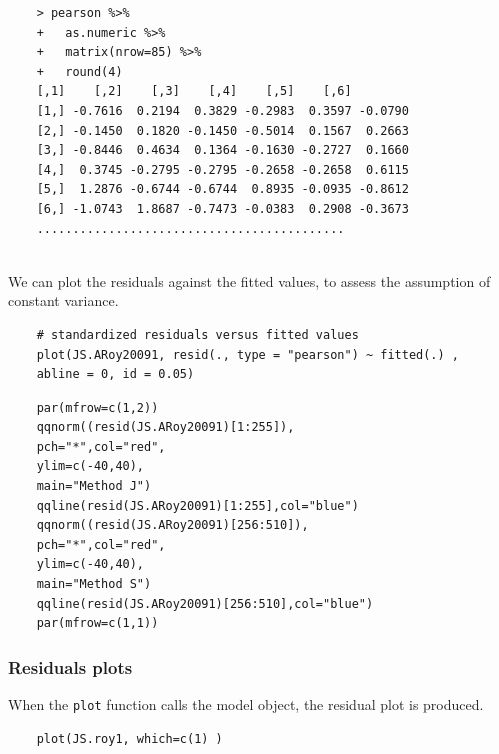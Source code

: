 \documentclass[Main.tex]{subfiles}
\begin{document}
\begin{framed}
	\begin{verbatim}
	> pearson %>%
	+   as.numeric %>% 
	+   matrix(nrow=85) %>%
	+   round(4) 
	[,1]    [,2]    [,3]    [,4]    [,5]    [,6]
	[1,] -0.7616  0.2194  0.3829 -0.2983  0.3597 -0.0790
	[2,] -0.1450  0.1820 -0.1450 -0.5014  0.1567  0.2663
	[3,] -0.8446  0.4634  0.1364 -0.1630 -0.2727  0.1660
	[4,]  0.3745 -0.2795 -0.2795 -0.2658 -0.2658  0.6115
	[5,]  1.2876 -0.6744 -0.6744  0.8935 -0.0935 -0.8612
	[6,] -1.0743  1.8687 -0.7473 -0.0383  0.2908 -0.3673
	...........................................
	
	\end{verbatim}
\end{framed}

We can plot the residuals against the fitted values, to assess the assumption of constant variance. 
\begin{framed}
	\begin{verbatim}
	# standardized residuals versus fitted values 
	plot(JS.ARoy20091, resid(., type = "pearson") ~ fitted(.) , 
	abline = 0, id = 0.05)
	\end{verbatim}
\end{framed}


\begin{framed}
	\begin{verbatim}
	par(mfrow=c(1,2))
	qqnorm((resid(JS.ARoy20091)[1:255]),
	pch="*",col="red",
	ylim=c(-40,40),
	main="Method J")
	qqline(resid(JS.ARoy20091)[1:255],col="blue")
	qqnorm((resid(JS.ARoy20091)[256:510]),
	pch="*",col="red",
	ylim=c(-40,40),
	main="Method S")
	qqline(resid(JS.ARoy20091)[256:510],col="blue")
	par(mfrow=c(1,1))
	\end{verbatim}	
\end{framed}

\subsubsection{Residuals plots}



When the \texttt{plot} function calls the model object, the residual plot is produced.




\begin{framed}
	\begin{verbatim}
	plot(JS.roy1, which=c(1) )
	\end{verbatim}
\end{framed}
\end{document}
